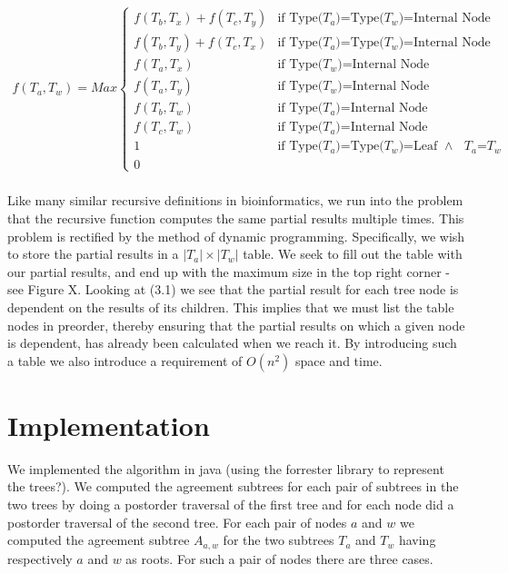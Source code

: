 \begin{equation}
\begin{aligned}
f(T_a,T_w)=Max
\begin{cases}
f(T_b,T_x)+f(T_c,T_y) & \text{if Type($T_a$)=Type($T_w$)=Internal Node}
\\
f(T_b,T_y)+f(T_c,T_x) & \text{if Type($T_a$)=Type($T_w$)=Internal Node}
\\
f(T_a, T_x)           & \text{if Type($T_w$)=Internal Node}
\\
f(T_a, T_y)           & \text{if Type($T_w$)=Internal Node}
\\
f(T_b, T_w)           & \text{if Type($T_a$)=Internal Node}
\\
f(T_c, T_w)           & \text{if Type($T_a$)=Internal Node}
\\
1 	                  & \text{if Type($T_a$)=Type($T_w$)=Leaf  $\land$  $T_a$=$T_w$}
\\
0                     
\end{cases}
\end{aligned}
\phantom{\hspace{6cm}}
\end{equation}
\\
Like many similar recursive definitions in bioinformatics, we run into the problem that the recursive function computes the same partial results multiple times. This problem is rectified by the method of dynamic programming. Specifically, we wish to store the partial results in a $|T_a| \times |T_w|$ table. We seek to fill out the table with our partial results, and end up with the maximum size in the top right corner - \todo{\dots} see Figure X.
Looking at (3.1) we see that the partial result for each tree node is dependent on the results of its children. This implies that we must list the table nodes in preorder, thereby ensuring that the partial results on which a given node is dependent, has already been calculated when we reach it. 
 By introducing such a table we also introduce a requirement of $O(n^2)$ space and time. 



\todo{\dots}

\section{Implementation}
We implemented the algorithm in java (using the forrester \cite{?} library to represent the trees?). We computed the agreement subtrees for each pair of subtrees in the two trees by doing a postorder traversal of the first tree and for each node did a postorder traversal of the second tree. For each pair of nodes $a$ and $w$ we computed the agreement subtree $A_{a,w}$ for the two subtrees $T_a$ and $T_w$ having respectively $a$ and $w$ as roots. For such a pair of nodes there are three cases.

